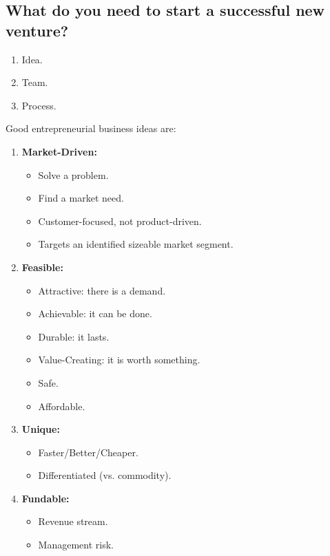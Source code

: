 \documentclass[a4paper,11pt]{article}
\begin{document}
\subsection{What do you need to start a successful new venture?}
\begin{enumerate}
    \item   Idea.
    \item   Team.
    \item   Process.
\end{enumerate}

Good entrepreneurial business ideas are:
\begin{enumerate}
    \item   \textbf{Market-Driven:}
            \begin{itemize}
                \item   Solve a problem.
                \item   Find a market need.
                \item   Customer-focused, not product-driven.
                \item   Targets an identified sizeable market segment.
            \end{itemize}
    \item   \textbf{Feasible:}
            \begin{itemize}
                \item   Attractive: there is a demand.
                \item   Achievable: it can be done.
                \item   Durable: it lasts.
                \item   Value-Creating: it is worth something.
                \item   Safe.
                \item   Affordable.
            \end{itemize}
    \item   \textbf{Unique:}
            \begin{itemize}
                \item   Faster/Better/Cheaper.
                \item   Differentiated (vs. commodity).
            \end{itemize}
    \item   \textbf{Fundable:}
            \begin{itemize}
                \item   Revenue stream.
                \item   Management risk.

\end{itemize}
\end{enumerate}
\end{document}
